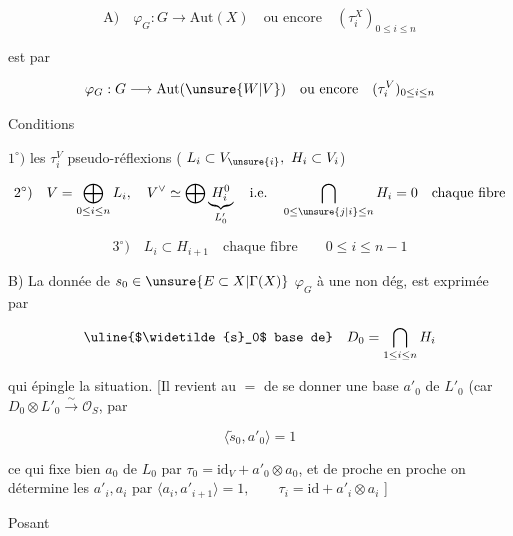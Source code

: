 \[
\text{A)}\quad \varphi_G:G\longrightarrow\mathrm{Aut}(X)\quad
\text{ou encore}\quad(\tau_i^X)_{0\le i\le n}
\]

est  par

\[
\varphi_G:G\longrightarrow\mathrm{Aut}(\unsure{W|V})\quad
\text{ou encore}\quad(\tau_i^V)_{0\le i\le n}
\]

Conditions

$1^\circ)$ les $\tau_i^V$ pseudo-réflexions ( $L_i\subset V_{\unsure{i}},\ H_i\subset V_i$)


\[
2^\circ)\quad V=\bigoplus_{0\le i\le n}L_i,\quad V^\vee\simeq
\bigoplus\underbrace{H_i^0}_{L'_0}\quad\text{i.e.}\quad
\bigcap_{0\le\unsure{j|i}\le n}H_i=0\quad\text{chaque fibre}
\]

\[
3^\circ)\quad L_i\subset H_{i+1}\quad\text{chaque fibre}\qquad0\le i\le n-1
\]

\deleted{\[
4^\circ)\quad\text{\unsure{Posant}}\quad D_0=\bigcap_{1\le i\le n}H_i,\quad\text{\unsure{il est|est}}
\]}

B) La donnée de $s_0\in\unsure{E\subset X|\Gamma(X)}$   $\varphi_G$ à une  non dég, est  exprimée par

\[
\text{\uline{$\widetilde{s}_0$ base de}}\quad D_0=\bigcap_{1\le i\le n}H_i
\]

qui épingle la situation.  [Il revient au $=$ de se donner une base  $a'_0$ de $L'_0$ (car $D_0\otimes L'_0\xrightarrow{\sim}\mathcal O_S$, par

\[
\boxed{\langle\widetilde{s}_0,a'_0\rangle=1}
\]

ce qui fixe bien $a_0$ de $L_0$ par $\tau_0=\mathrm{id}_V+a'_0\otimes a_0$, et de proche en proche on détermine les $a'_i,a_i$ par $\langle a_i,a'_{i+1}\rangle=1,\qquad\tau_i=\mathrm{id}+a'_i\otimes a_i$ ]

Posant

